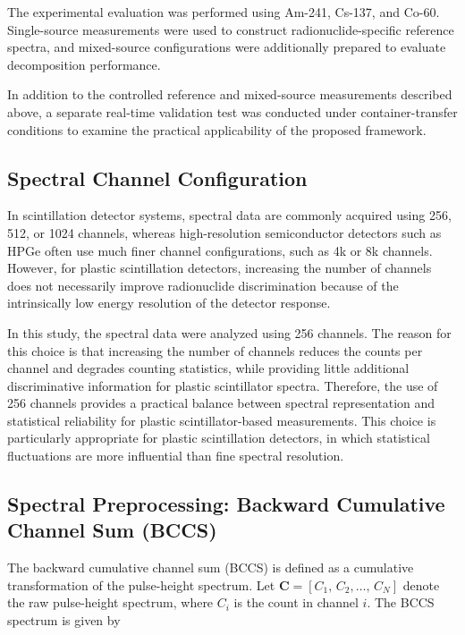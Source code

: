 \documentclass[10pt]{wlscirep}
\begin{document}
\color{red}
The experimental evaluation was performed using Am-241, Cs-137, and Co-60. Single-source measurements were used to construct radionuclide-specific reference spectra, and mixed-source configurations were additionally prepared to evaluate decomposition performance.

In addition to the controlled reference and mixed-source measurements described above, a separate real-time validation test was conducted under container-transfer conditions to examine the practical applicability of the proposed framework.

\normalcolor
\subsection*{Spectral Channel Configuration}

In scintillation detector systems, spectral data are commonly acquired using 256, 512, or 1024 channels, whereas high-resolution semiconductor detectors such as HPGe often use much finer channel configurations, such as 4k or 8k channels. However, for plastic scintillation detectors, increasing the number of channels does not necessarily improve radionuclide discrimination because of the intrinsically low energy resolution of the detector response.

In this study, the spectral data were analyzed using 256 channels. The reason for this choice is that increasing the number of channels reduces the counts per channel and degrades counting statistics, while providing little additional discriminative information for plastic scintillator spectra. Therefore, the use of 256 channels provides a practical balance between spectral representation and statistical reliability for plastic scintillator-based measurements. This choice is particularly appropriate for plastic scintillation detectors, in which statistical
fluctuations are more influential than fine spectral resolution.


\subsection*{Spectral Preprocessing: Backward Cumulative Channel Sum (BCCS)}
\color{red}
The backward cumulative channel sum (BCCS) is defined as a cumulative transformation of the pulse-height spectrum. Let $\mathbf{C} = [C_1,\,C_2,\ldots,\,C_N]$ denote the raw pulse-height spectrum, where $C_i$ is the count in channel $i$. The BCCS spectrum is given by
\end{document}
